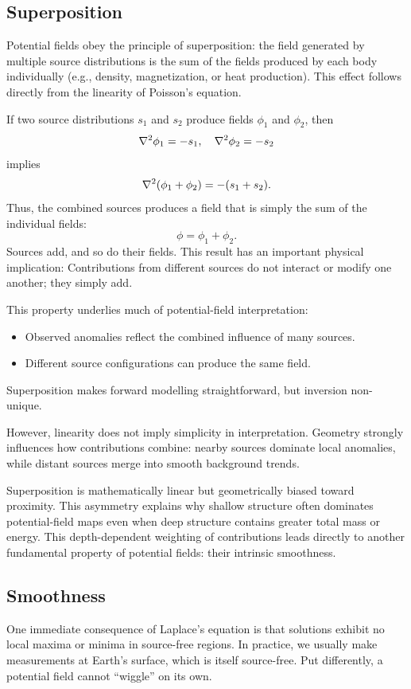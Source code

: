 \subsection{Superposition}

Potential fields obey the principle of superposition: the field generated by multiple source distributions is the sum of the fields produced by each body individually (e.g., density, magnetization, or heat production).  This effect follows directly from the linearity of Poisson's equation.

If two source distributions $s_1$ and $s_2$ produce fields $\phi_1$ and $\phi_2$, then
\[
    \laplacian \phi_1 = -s_1, \quad \laplacian \phi_2 = -s_2
\]
implies
\[
    \laplacian (\phi_1 + \phi_2) = -(s_1 + s_2).
\]
Thus, the combined sources produces a field that is simply the sum of the individual fields:
\[
    \phi = \phi_1 + \phi_2.
\]
Sources add, and so do their fields.  This result has an important physical implication: Contributions from different sources do not interact or modify one another; they simply add.

This property underlies much of potential-field interpretation:
\begin{itemize}
    \item Observed anomalies reflect the combined influence of many sources.
    \item Different source configurations can produce the same field.
\end{itemize}
Superposition makes forward modelling straightforward, but inversion non-unique.

However, linearity does not imply simplicity in interpretation. Geometry strongly influences how contributions combine: nearby sources dominate local anomalies, while distant sources merge into smooth background trends.

Superposition is mathematically linear but geometrically biased toward proximity.  This asymmetry explains why shallow structure often dominates potential-field maps even when deep structure contains greater total mass or energy.  This depth-dependent weighting of contributions leads directly to another fundamental property of potential fields: their intrinsic smoothness.

\subsection{Smoothness}

One immediate consequence of Laplace's equation is that solutions exhibit no local maxima or minima in source-free regions. In practice, we usually make measurements at Earth's surface, which is itself source-free. Put differently, a potential field cannot ``wiggle'' on its own.

